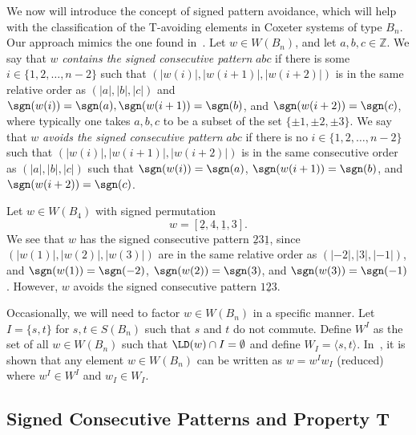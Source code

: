 We now will introduce the concept of signed pattern avoidance, which will help with the classification of the T-avoiding elements in Coxeter systems of type $B_n$. Our approach mimics the one found in~\cite{Gern2013a}. Let $w \in W(B_n)$, and let $a,b,c \in \mathbb{Z}$. We say that $w$ \emph{contains the signed consecutive pattern} $abc$ if there is some $i \in \{1,2, \ldots, n-2\}$ such that $(|w(i)|,|w(i+1)|,|w(i+2)|)$ is in the same relative order as $(|a|,|b|,|c|)$ and $\sgn(w(i))=\sgn(a), \sgn(w(i+1))=\sgn(b)$, and $\sgn(w(i+2))=\sgn(c)$, where typically one takes $a,b,c$ to be a subset of the set $\{\pm1,\pm2,\pm3\}$. We say that $w$ \emph{avoids the signed consecutive pattern} $abc$ if there is no $i \in \{1,2, \ldots, n-2\}$ such that $\left(|w(i)|, |w(i+1)|, |w(i+2)|\right)$ is in the same consecutive order as $\left(|a|, |b|, |c| \right)$ such that $\sgn(w(i))=\sgn(a)$, $\sgn(w(i+1))=\sgn(b)$, and $\sgn(w(i+2))=\sgn(c)$.

\begin{example}
Let $w \in W(B_4)$ with signed permutation \[w=[\underline{2},4, \underline{1}, 3].\] We see that $w$ has the signed consecutive pattern $\underline{2} 3 \underline{1}$, since $(|w(1)|, |w(2)|, |w(3)|)$ are in the same relative order as $(|-2|, |3|, |-1|)$, and $\sgn(w(1))=\sgn(-2)$, $\sgn(w(2))=\sgn(3)$, and $\sgn(w(3))=\sgn(-1)$. However, $w$ avoids the signed consecutive pattern $1\underline{2}3$.
\end{example}

Occasionally, we will need to factor $w \in W(B_n)$ in a specific manner. Let $I=\{s,t\}$ for $s, t \in S(B_n)$ such that $s$ and $t$ do not commute. Define $W^I$ as the set of all $w \in W(B_n)$ such that $\LD(w) \cap I= \emptyset$ and define $W_I=\langle s,t \rangle$. In~\cite{Humphreys1990}, it is shown that any element $w \in W(B_n)$ can be written as $w=w^Iw_I$ (reduced) where $w^I \in W^I$ and $w_I \in W_I$.

\subsection{Signed Consecutive Patterns and Property T}\label{sec:TAB}



